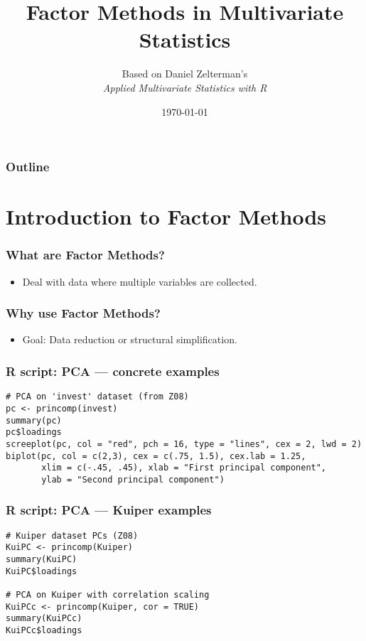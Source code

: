 \documentclass{beamer}
\title{Factor Methods in Multivariate Statistics}
\author{Based on Daniel Zelterman's \\ \textit{Applied Multivariate Statistics with R}}
\date{\today}
\begin{document}
\frame{\titlepage}

\begin{frame}
    \frametitle{Outline}
    \tableofcontents
\end{frame}

\section{Introduction to Factor Methods}

\begin{frame}
    \frametitle{What are Factor Methods?}
    \begin{itemize}
        \item Deal with data where multiple variables are collected.
    \end{itemize}
\end{frame}

\begin{frame}
    \frametitle{Why use Factor Methods?}
    \begin{itemize}
        \item Goal: \alert{Data reduction} or \alert{structural simplification}.
    \end{itemize}
\end{frame}

\begin{frame}[fragile]
    \frametitle{R script: PCA — concrete examples}
    \begin{verbatim}
# PCA on 'invest' dataset (from Z08)
pc <- princomp(invest)
summary(pc)
pc$loadings
screeplot(pc, col = "red", pch = 16, type = "lines", cex = 2, lwd = 2)
biplot(pc, col = c(2,3), cex = c(.75, 1.5), cex.lab = 1.25,
       xlim = c(-.45, .45), xlab = "First principal component",
       ylab = "Second principal component")
    \end{verbatim}
\end{frame}

\begin{frame}[fragile]
    \frametitle{R script: PCA — Kuiper examples}
    \begin{verbatim}
# Kuiper dataset PCs (Z08)
KuiPC <- princomp(Kuiper)
summary(KuiPC)
KuiPC$loadings

# PCA on Kuiper with correlation scaling
KuiPCc <- princomp(Kuiper, cor = TRUE)
summary(KuiPCc)
KuiPCc$loadings
    \end{verbatim}
\end{frame}
\end{document}
